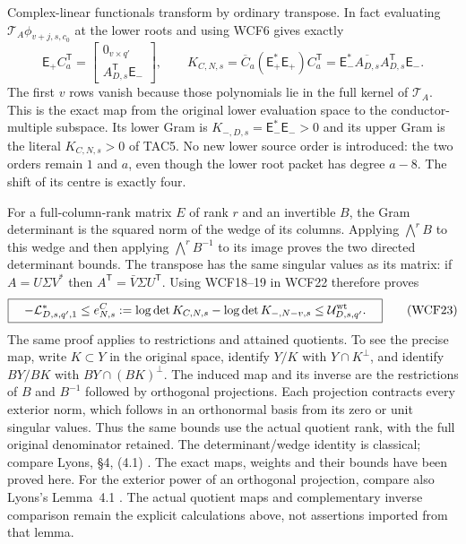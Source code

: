 Complex-linear functionals transform by ordinary transpose. In fact
evaluating $\mathcal T_A\phi_{v+j,s,c_0}$ at the lower roots and using
WCF6 gives exactly
\[
 \boxed{\quad \mathsf E_+ C_a^{\mathsf T}
       =\begin{bmatrix}0_{v\times q'}\\ A_{D,s}^{\mathsf T}\mathsf E_-\end{bmatrix},
 \qquad
 K_{C,N,s}=\overline C_a(\mathsf E_+^*\mathsf E_+)C_a^{\mathsf T}
       =\mathsf E_-^*\overline{A_{D,s}}A_{D,s}^{\mathsf T}\mathsf E_-.
 \quad}\tag{WCF22}
\]
The first $v$ rows vanish because those polynomials lie in the full
kernel of $\mathcal T_A$. This is the exact map from the original
lower evaluation space to the conductor-multiple subspace. Its lower
Gram is $K_{-,D,s}=\mathsf E_-^*\mathsf E_->0$ and its upper Gram
is the literal $K_{C,N,s}>0$ of TAC5. No new lower source order is
introduced: the two orders remain $1$ and $a$, even though the lower
root packet has degree $a-8$. The shift of its centre is exactly four.

For a full-column-rank matrix $E$ of rank $r$ and an invertible $B$,
the Gram determinant is the squared norm of the wedge of its columns.
Applying $\bigwedge^r B$ to this wedge and then applying
$\bigwedge^rB^{-1}$ to its image proves the two directed determinant
bounds. The transpose has the same singular values as its matrix:
if $A=U\Sigma V^*$ then $A^{\mathsf T}=\bar V\Sigma U^{\mathsf T}$.
Using WCF18--19 in WCF22 therefore proves
\[
 \boxed{\quad
 -\mathcal L_{D,s,q',1}^*
 \le e_{N,s}^{C}:=\log\det K_{C,N,s}-\log\det K_{-,N-v,s}
 \le\mathcal U^{\rm wt}_{D,s,q'}.
 \quad}\tag{WCF23}
\]
The same proof applies to restrictions and attained quotients. To see
the precise map, write $K\subset Y$ in the original space, identify
$Y/K$ with $Y\cap K^\perp$, and identify $BY/BK$ with
$BY\cap(BK)^\perp$. The induced map and its inverse are the
restrictions of $B$ and $B^{-1}$ followed by orthogonal projections.
Each projection contracts every exterior norm, which follows in an
orthonormal basis from its zero or unit singular values. Thus the
same bounds use the actual quotient rank, with the full original
denominator retained. The determinant/wedge identity is classical;
compare Lyons, \S4, (4.1) \cite{human:lyons2003}. The exact maps,
weights and their bounds have been proved here.
For the exterior power of an orthogonal projection, compare also
Lyons's Lemma~4.1 \cite[\S4, Lemma~4.1, preprint p.~12]{human:lyons2003}.
The actual quotient maps and complementary inverse comparison remain
the explicit calculations above, not assertions imported from that lemma.

